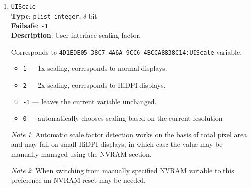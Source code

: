 \documentclass[]{article}
\providecommand{\tightlist}{%
  \setlength{\itemsep}{0pt}\setlength{\parskip}{0pt}}
\begin{document}
\begin{enumerate}
  The use of \texttt{BuiltinGraphics} is straightforward.
  For most platforms, it is necessary to enable \texttt{ProvideConsoleGop}
  and set \texttt{Resolution} to \texttt{Max}. The \texttt{BuiltinText} variant is
  an alternative to \texttt{BuiltinGraphics} for some very old and defective
  laptop firmware, which can only draw in \texttt{Text} mode.

  The use of \texttt{System} protocols is more complicated. Typically,
  the preferred setting is \texttt{SystemGraphics} or \texttt{SystemText}.
  Enabling \texttt{ProvideConsoleGop}, setting \texttt{Resolution} to
  \texttt{Max}, enabling \texttt{ReplaceTabWithSpace} is useful on almost
  all platforms. \texttt{SanitiseClearScreen}, \texttt{IgnoreTextInGraphics},
  and \texttt{ClearScreenOnModeSwitch} are more specific, and their use
  depends on the firmware.

  \emph{Note}: Some Macs, such as the \texttt{MacPro5,1}, may have incompatible
  console output when using modern GPUs, and thus only \texttt{BuiltinGraphics}
  may work for them in such cases. NVIDIA GPUs may require additional
  \href{https://github.com/acidanthera/bugtracker/issues/1280}{firmware upgrades}.

\item
  \texttt{UIScale}\\
  \textbf{Type}: \texttt{plist\ integer}, 8 bit\\
  \textbf{Failsafe}: \texttt{-1}\\
  \textbf{Description}: User interface scaling factor.

  Corresponds to \texttt{4D1EDE05-38C7-4A6A-9CC6-4BCCA8B38C14:UIScale} variable.
  \begin{itemize}
    \tightlist
    \item \texttt{1} --- 1x scaling, corresponds to normal displays.
    \item \texttt{2} --- 2x scaling, corresponds to HiDPI displays.
    \item \texttt{-1} --- leaves the current variable unchanged.
    \item \texttt{0} --- automatically chooses scaling based on the current resolution.
  \end{itemize}

  \emph{Note 1}: Automatic scale factor detection works on the basis of total pixel area and may fail on small HiDPI displays,
  in which case the value may be manually managed using the NVRAM section.

  \emph{Note 2}: When switching from manually specified NVRAM variable to this preference an NVRAM reset may be needed.


\end{enumerate}
\end{document}
